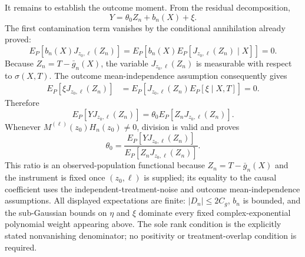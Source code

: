 It remains to establish the outcome moment.  From the residual decomposition,
\[
Y=\theta_0Z_n+b_n(X)+\xi.
\]
The first contamination term vanishes by the conditional annihilation already proved:
\[
E_P\!\left[b_n(X)J_{z_0,\ell}(Z_n)\right]
=E_P\!\left[b_n(X)E_P\!\left[J_{z_0,\ell}(Z_n)\mid X\right]\right]
=0.
\]
Because \(Z_n=T-\bar g_n(X)\), the variable \(J_{z_0,\ell}(Z_n)\) is measurable with respect to \(\sigma(X,T)\).  The outcome mean-independence assumption consequently gives
\[
\begin{aligned}
E_P\!\left[\xi J_{z_0,\ell}(Z_n)\right]
&=E_P\!\left[
J_{z_0,\ell}(Z_n)E_P[\xi\mid X,T]
\right]
=0.
\end{aligned}
\]
Therefore
\[
E_P\!\left[YJ_{z_0,\ell}(Z_n)\right]
=\theta_0E_P\!\left[Z_nJ_{z_0,\ell}(Z_n)\right].
\]
Whenever \(M^{(\ell)}(z_0)H_n(z_0)\neq0\), division is valid and proves
\[
\theta_0
=\frac{E_P[YJ_{z_0,\ell}(Z_n)]}
       {E_P[Z_nJ_{z_0,\ell}(Z_n)]}.
\]
This ratio is an observed-population functional because \(Z_n=T-\bar g_n(X)\) and the instrument is fixed once \((z_0,\ell)\) is supplied; its equality to the causal coefficient uses the independent-treatment-noise and outcome mean-independence assumptions.  All displayed expectations are finite: \(|D_n|\leq2C_g\), \(b_n\) is bounded, and the sub-Gaussian bounds on \(\eta\) and \(\xi\) dominate every fixed complex-exponential polynomial weight appearing above.  The sole rank condition is the explicitly stated nonvanishing denominator; no positivity or treatment-overlap condition is required.